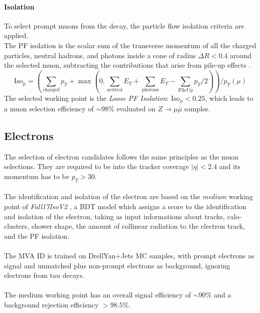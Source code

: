 \paragraph*{Isolation}
To select prompt muons from the \PW decay, the particle flow isolation criteria are applied.
\\
The PF isolation is the scalar sum of the transverse momentum of all the charged particles, neutral hadrons, and  photons inside a cone of radius $\Delta R<0.4$ around the selected muon, subtracting the contributions that arise from pile-up effects \cite{2018MuonData}.    
\begin{equation}
    \text{Iso}_\mu = \left(\sum_{\text{charged}} p_T+\max\left(0,\sum_{\text{neutral}}E_T+\sum_{\text{photons}}E_T-\sum_{\text{PileUp}}p_T/2\right)\right)\bigg/p_T(\mu)
\end{equation}
The selected working point is the \emph{Loose PF Isolation}: $\text{Iso}_\mu<0.25$, which leads to a muon selection efficiency of $\sim 98\%$ evaluated on $Z \to \mu \bar{\mu}$ samples.






\subsection{Electrons}
The selection of electron candidates follows the same principles as the muon selections.
They are required to be into the tracker coverage $|\eta|<2.4$ and its momentum has to be $p_T>30$.\\
\\
The identification and isolation of the electron are based on the \emph{medium} working point of \textit{Fall17IsoV2} \cite{2018ElectronConference}, a BDT model which assigns a score to the identification and isolation of the electron, taking as input informations about tracks, calo-clusters, shower shape, the amount of collinear radiation to the electron track, and the PF isolation.\\
\\
The MVA ID is trained on DrellYan+Jets MC samples, with prompt electrons as signal and unmatched plus non-prompt electrons as background, ignoring electrons from tau decays.\\
\\
The medium working point has an overall signal efficiency of $\sim 90\%$ and a background rejection efficiency $>98.5\%$.
